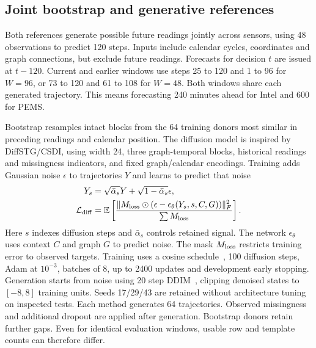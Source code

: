 \documentclass{llncs}
\newcommand{\E}{\mathbb E}
\begin{document}
\subsection{Joint bootstrap and generative references}
Both references generate possible future readings jointly across sensors,
using 48 observations to predict 120 steps. Inputs include calendar cycles,
coordinates and graph connections, but exclude future readings. Forecasts
for decision $t$ are issued at $t-120$. Current and earlier windows use
steps 25 to 120 and 1 to 96 for $W=96$, or 73 to 120 and 61 to 108 for $W=48$.
Both windows share each generated trajectory. This means forecasting
240 minutes ahead for Intel and 600 for PEMS.

Bootstrap resamples intact blocks from the 64 training donors most similar
in preceding readings and calendar position. The diffusion model is inspired
by DiffSTG/CSDI, using width 24, three graph-temporal blocks, historical
readings and missingness indicators, and fixed graph/calendar encodings.
Training adds Gaussian noise $\epsilon$ to trajectories $Y$ and learns to
predict that noise
\begin{align}
Y_s&=\sqrt{\bar\alpha_s}Y+\sqrt{1-\bar\alpha_s}\epsilon,\\
\mathcal L_{\rm diff}&=\E\left[
\frac{\|M_{\rm loss}\odot(\epsilon-\epsilon_\theta(Y_s,s,C,G))\|_F^2}{\sum M_{\rm loss}}\right].\label{eq:diff}
\end{align}
Here $s$ indexes diffusion steps and $\bar\alpha_s$ controls retained signal.
The network $\epsilon_\theta$ uses context $C$ and graph $G$ to predict noise.
The mask $M_{\rm loss}$ restricts training error to observed targets.
Training uses a cosine schedule~\cite{cosine}, 100 diffusion steps, Adam
at $10^{-3}$, batches of 8, up to 2400 updates and development early stopping.
Generation starts from noise using 20 step DDIM~\cite{ddim}, clipping denoised
states to $[-8,8]$ training units. Seeds 17/29/43 are retained without
architecture tuning on inspected tests.
Each method generates 64 trajectories. Observed missingness and additional
dropout are applied after generation. Bootstrap donors retain further gaps.
Even for identical evaluation windows, usable row and template counts
can therefore differ.
\end{document}
